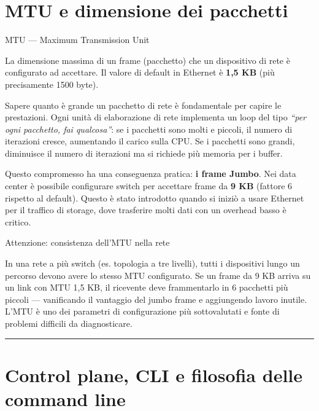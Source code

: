 \documentclass[
  italian,
  openany]{book}
\begin{document}
\section{MTU e dimensione dei
pacchetti}\label{mtu-e-dimensione-dei-pacchetti}

\begin{calloutdefinition}{MTU — Maximum Transmission Unit}

La dimensione massima di un frame (pacchetto) che un dispositivo di rete
è configurato ad accettare. Il valore di default in Ethernet è
\textbf{1,5 KB} (più precisamente 1500 byte).

\end{calloutdefinition}

Sapere quanto è grande un pacchetto di rete è fondamentale per capire le
prestazioni. Ogni unità di elaborazione di rete implementa un loop del
tipo \emph{``per ogni pacchetto, fai qualcosa''}: se i pacchetti sono
molti e piccoli, il numero di iterazioni cresce, aumentando il carico
sulla CPU. Se i pacchetti sono grandi, diminuisce il numero di
iterazioni ma si richiede più memoria per i buffer.

Questo compromesso ha una conseguenza pratica: \textbf{i frame Jumbo}.
Nei data center è possibile configurare switch per accettare frame da
\textbf{9 KB} (fattore 6 rispetto al default). Questo è stato introdotto
quando si iniziò a usare Ethernet per il traffico di storage, dove
trasferire molti dati con un overhead basso è critico.

\begin{calloutwarning}{Attenzione: consistenza dell’MTU nella rete}

In una rete a più switch (es. topologia a tre livelli), tutti i
dispositivi lungo un percorso devono avere lo stesso MTU configurato. Se
un frame da 9 KB arriva su un link con MTU 1,5 KB, il ricevente deve
frammentarlo in 6 pacchetti più piccoli --- vanificando il vantaggio del
jumbo frame e aggiungendo lavoro inutile. L'MTU è uno dei parametri di
configurazione più sottovalutati e fonte di problemi difficili da
diagnosticare.

\end{calloutwarning}

\begin{center}\rule{0.5\linewidth}{0.5pt}\end{center}

\section{Control plane, CLI e filosofia delle command
line}\label{control-plane-cli-e-filosofia-delle-command-line}
\end{document}
